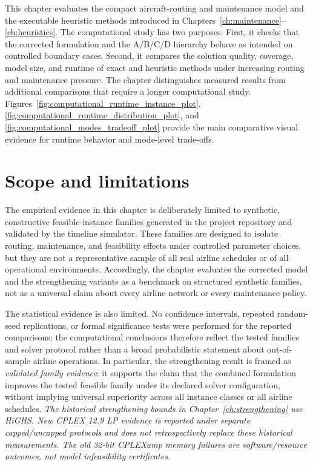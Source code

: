 This chapter evaluates the compact aircraft-routing and maintenance model and
 the executable heuristic methods introduced in Chapters~\ref{ch:maintenance}--
\ref{ch:heuristics}. The computational study has two purposes. First, it
checks that the corrected formulation and the A/B/C/D hierarchy behave as
intended on controlled boundary cases. Second, it compares the solution quality,
coverage, model size, and runtime of exact and heuristic methods under increasing
routing and maintenance pressure. The chapter distinguishes measured results
from additional comparisons that require a longer computational study.
Figures~\ref{fig:computational_runtime_instance_plot},
\ref{fig:computational_runtime_distribution_plot}, and
\ref{fig:computational_modes_tradeoff_plot} provide the main comparative
visual evidence for runtime behavior and mode-level trade-offs.

\section{Scope and limitations}
\label{sec:computational_scope}

The empirical evidence in this chapter is deliberately limited to synthetic,
constructive feasible-instance families generated in the project repository and
validated by the timeline simulator. These families are designed to isolate
routing, maintenance, and feasibility effects under controlled parameter choices,
but they are not a representative sample of all real airline schedules or of all
operational environments. Accordingly, the chapter evaluates the corrected model
and the strengthening variants as a benchmark on structured synthetic families,
not as a universal claim about every airline network or every maintenance policy.

The statistical evidence is also limited. No confidence intervals, repeated
random-seed replications, or formal significance tests were performed for the
reported comparisons; the computational conclusions therefore reflect the tested
families and solver protocol rather than a broad probabilistic statement about
out-of-sample airline operations. In particular, the strengthening result is
framed as \emph{validated family evidence}: it supports the claim that the
combined formulation improves the tested feasible family under its declared
solver configuration, without implying universal superiority across all instance
classes or all airline schedules. \textit{The historical strengthening bounds in
Chapter~\ref{ch:strengthening} use HiGHS. New CPLEX 12.9 LP evidence is reported
under separate capped/uncapped protocols and does not retrospectively replace
these historical measurements. The old 32-bit CPLEXamp memory failures are
software/resource outcomes, not model infeasibility certificates.}

